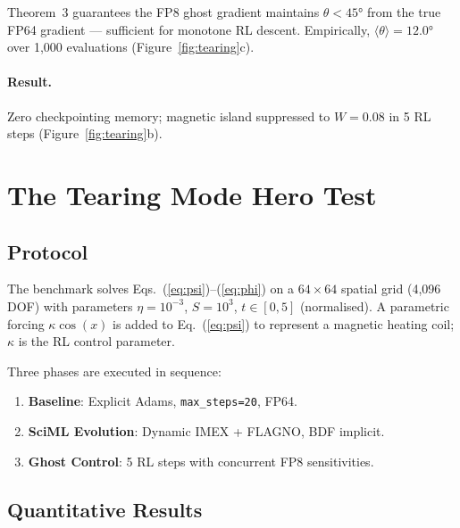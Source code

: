 \documentclass[11pt,twocolumn]{article}
\begin{document}
Theorem~3 guarantees the FP8 ghost gradient maintains $\theta < 45°$
from the true FP64 gradient — sufficient for monotone RL descent.
Empirically, $\langle\theta\rangle = 12.0°$ over 1,000 evaluations
(Figure~\ref{fig:tearing}c).

\paragraph{Result.} Zero checkpointing memory; magnetic island suppressed
to $W=0.08$ in 5 RL steps (Figure~\ref{fig:tearing}b).


\section{The Tearing Mode Hero Test}
\label{sec:benchmark}

\subsection{Protocol}

The benchmark solves Eqs.~(\ref{eq:psi})--(\ref{eq:phi}) on a $64\times64$
spatial grid (4,096 DOF) with parameters $\eta=10^{-3}$, $S=10^3$,
$t\in[0,5]$ (normalised). A parametric forcing
$\kappa\cos(x)$ is added to Eq.~(\ref{eq:psi}) to represent a magnetic
heating coil; $\kappa$ is the RL control parameter.

Three phases are executed in sequence:
\begin{enumerate}
  \item \textbf{Baseline}: Explicit Adams, \texttt{max\_steps=20}, FP64.
  \item \textbf{SciML Evolution}: Dynamic IMEX + FLAGNO, BDF implicit.
  \item \textbf{Ghost Control}: 5 RL steps with concurrent FP8 sensitivities.
\end{enumerate}

\subsection{Quantitative Results}
\end{document}
